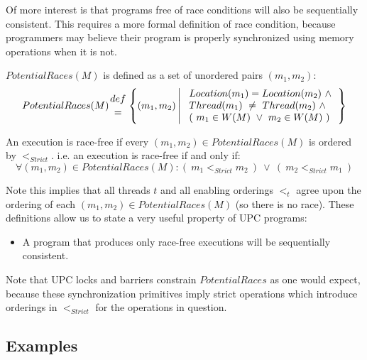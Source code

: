 \np Of more interest is that programs free of race conditions 
will also be sequentially consistent.  This requires a more
formal definition of race condition, because programmers
may believe their program is properly synchronized using
memory operations when it is not.  


\np $PotentialRaces(M)$ is defined as a set of unordered pairs $(m_1, m_2)$:
\[
PotentialRaces(M) {def \atop =} \left\{(m_1, m_2)\left|\ 
\begin{array}{l} Location(m_1) = Location(m_2)\ \land\\
                 Thread(m_1)\ \neq\ Thread(m_2)\ \land\\
                 (\ m_1 \in W(M)\ \lor\ m_2 \in W(M)\ )\end{array}\right.\right\}
\]

\np An execution is race-free if every $(m_1, m_2) \in PotentialRaces(M)$ is ordered by $<_{Strict}$.
 i.e. an execution is race-free if and only if:
\[
\forall (m_1, m_2) \in PotentialRaces(M) : (\ m_1 <_{Strict} m_2\ )\ \lor\ (\ m_2 <_{Strict} m_1\ )
\]

\np Note this implies that all threads $t$ and all enabling orderings $<_t$ agree upon the ordering of each $(m_1, m_2) \in PotentialRaces(M)$ (so there is no race).  
These definitions allow us to state a very useful property of UPC programs:

\begin{itemize}
\item A program that produces only race-free executions will be sequentially consistent.  
\end{itemize}

\np Note that UPC locks and barriers constrain $PotentialRaces$ as one would
expect, because these synchronization primitives imply 
strict operations which introduce orderings in $<_{Strict}$ for the operations in question.

\subsection{Examples}
\label{MemModelExamples}

